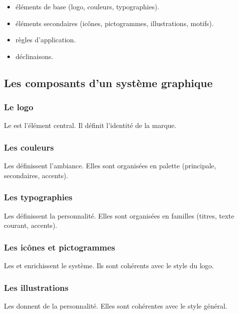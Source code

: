 \begin{itemize}
    \item {} éléments de base (logo, couleurs, typographies).
    \item {} éléments secondaires (icônes, pictogrammes, illustrations, motifs).
    \item {} règles d'application.
    \item {} déclinaisons.
\end{itemize}

\subsection{Les composants d'un système graphique}

\subsubsection{Le logo}

Le  est l'élément central. Il définit l'identité de la marque.

\subsubsection{Les couleurs}

Les  définissent l'ambiance. Elles sont organisées en palette (principale, secondaires, accents).

\subsubsection{Les typographies}

Les  définissent la personnalité. Elles sont organisées en familles (titres, texte courant, accents).

\subsubsection{Les icônes et pictogrammes}

Les  et  enrichissent le système. Ils sont cohérents avec le style du logo.

\subsubsection{Les illustrations}

Les  donnent de la personnalité. Elles sont cohérentes avec le style général.

